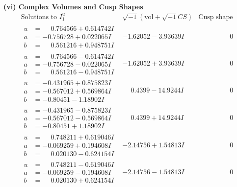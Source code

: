\documentclass[1p]{elsarticle_modified}
\theoremstyle{definition}
\newcommand{\I}{\sqrt{-1}}
\begin{document}
\newpage\flushleft \textbf{(vi) Complex Volumes and Cusp Shapes}
$$\begin{array}{c|c|c}  
\text{Solutions to }I^u_{1}& \I (\text{vol} + \sqrt{-1}CS) & \text{Cusp shape}\\
 \hline 
\begin{aligned}
u &= \phantom{-}0.764566 + 0.614742 I \\
a &= -0.756728 + 0.022065 I \\
b &= \phantom{-}0.561216 + 0.948751 I\end{aligned}
 & -1.62052 - 3.93639 I & \phantom{-0.000000 } 0 \\ \hline\begin{aligned}
u &= \phantom{-}0.764566 - 0.614742 I \\
a &= -0.756728 - 0.022065 I \\
b &= \phantom{-}0.561216 - 0.948751 I\end{aligned}
 & -1.62052 + 3.93639 I & \phantom{-0.000000 } 0 \\ \hline\begin{aligned}
u &= -0.431965 + 0.875823 I \\
a &= -0.567012 + 0.569864 I \\
b &= -0.80451 - 1.18902 I\end{aligned}
 & \phantom{-}0.4399 - 14.9244 I & \phantom{-0.000000 } 0 \\ \hline\begin{aligned}
u &= -0.431965 - 0.875823 I \\
a &= -0.567012 - 0.569864 I \\
b &= -0.80451 + 1.18902 I\end{aligned}
 & \phantom{-}0.4399 + 14.9244 I & \phantom{-0.000000 } 0 \\ \hline\begin{aligned}
u &= \phantom{-}0.748211 + 0.619046 I \\
a &= -0.069259 + 0.194608 I \\
b &= \phantom{-}0.020130 - 0.624154 I\end{aligned}
 & -2.14756 + 1.54813 I & \phantom{-0.000000 } 0 \\ \hline\begin{aligned}
u &= \phantom{-}0.748211 - 0.619046 I \\
a &= -0.069259 - 0.194608 I \\
b &= \phantom{-}0.020130 + 0.624154 I\end{aligned}
 & -2.14756 - 1.54813 I & \phantom{-0.000000 } 0 \\ \hline\begin{aligned}

\end{aligned}
\end{array}$$
\end{document}
